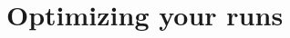 \documentclass[10pt,leqno, oneside]{book}
\begin{document}


\section{Optimizing your runs}

\end{document}
